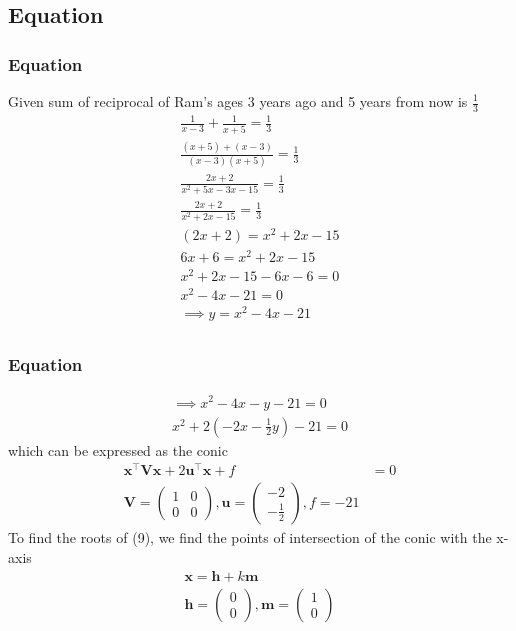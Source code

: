 \documentclass{beamer}
\providecommand{\brak}[1]{\ensuremath{\left(#1\right)}}
\theoremstyle{remark}
\newcommand{\myvec}[1]{\ensuremath{\begin{pmatrix}#1\end{pmatrix}}}
\let\vec\mathbf
\numberwithin{equation}{section}
\begin{document}
\subsection{Equation}
\begin{frame}
\frametitle{Equation}
Given sum of reciprocal of Ram's ages 3 years ago and 5 years from
now is $\frac{1}{3}$
\begin{align}
\frac{1}{x-3}+\frac{1}{x+5}=\frac{1}{3} \\
\frac{\brak{x+5}+\brak{x-3}}{\brak{x-3}\brak{x+5}}=\frac{1}{3} \\
\frac{2x+2}{x^2+5x-3x-15}=\frac{1}{3}\\
\frac{2x+2}{x^2+2x-15}=\frac{1}{3}\\
\brak{2x+2}=x^2+2x-15\\
6x+6=x^2+2x-15 \\
x^2+2x-15-6x-6=0 \\
x^2-4x-21=0 \\
\implies y=x^2-4x-21 \\

  \end{align}
\end{frame}
\begin{frame}
\frametitle{Equation}
\begin{align}
\implies x^2-4x-y-21=0\\
x^2+2(-2x-\frac{1}{2}y)-21=0
\end{align}
 which can be expressed as the conic
  \begin{align}
       \vec{x}^\top\vec{V}\vec{x} + 2\vec{u}^\top\vec{x} + f &= 0 \\
       \vec{V}=\myvec{1 & 0 \\ 0&0},\vec{u}=\myvec{-2\\-\frac{1}{2}},f=-21
  \end{align}
   To find the roots of (9), we find the points of intersection of the conic with
the x-axis
\begin{align}
\vec{x}=\vec{h}+k\vec{m}\\
\vec{h}=\myvec{0\\0},\vec{m}=\myvec{1\\0}
\end{align}
 \end{frame}
\end{document}
